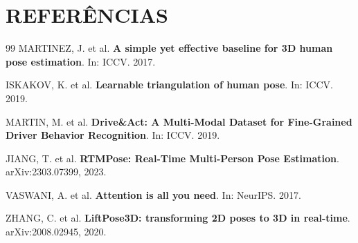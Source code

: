 \documentclass[12pt, a4paper]{article}
\begin{document}
\section{REFERÊNCIAS}
\begin{thebibliography}{99}
    MARTINEZ, J. et al. \textbf{A simple yet effective baseline for 3D human pose estimation}. In: ICCV. 2017.

    ISKAKOV, K. et al. \textbf{Learnable triangulation of human pose}. In: ICCV. 2019.

    MARTIN, M. et al. \textbf{Drive\&Act: A Multi-Modal Dataset for Fine-Grained Driver Behavior Recognition}. In: ICCV. 2019.

    JIANG, T. et al. \textbf{RTMPose: Real-Time Multi-Person Pose Estimation}. arXiv:2303.07399, 2023.

    VASWANI, A. et al. \textbf{Attention is all you need}. In: NeurIPS. 2017.

    ZHANG, C. et al. \textbf{LiftPose3D: transforming 2D poses to 3D in real-time}. arXiv:2008.02945, 2020.
\end{thebibliography}
\end{document}
